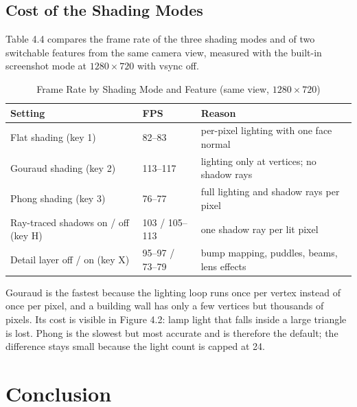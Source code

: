 \documentclass[12pt, a4paper]{report}
\begin{document}
\subsection*{Cost of the Shading Modes}

\begin{justify}
  {\fontsize{12}{13.8}\selectfont
    Table 4.4 compares the frame rate of the three shading modes and of two switchable features from the same camera view, measured with the built-in screenshot mode at $1280\times720$ with vsync off.
  }
\end{justify}

\begin{table}[!htbp]
  \caption{Frame Rate by Shading Mode and Feature (same view, $1280\times720$)}
  \label{tab:4.4}
  \centering
  {\fontsize{10}{12.5}\selectfont
    \begin{tabular}{|p{2.2in}|p{0.9in}|p{2.3in}|}
      \hline
      \textbf{Setting} & \textbf{FPS} & \textbf{Reason} \\
      \hline
      Flat shading (key 1) & 82--83 & per-pixel lighting with one face normal \\
      \hline
      Gouraud shading (key 2) & 113--117 & lighting only at vertices; no shadow rays \\
      \hline
      Phong shading (key 3) & 76--77 & full lighting and shadow rays per pixel \\
      \hline
      Ray-traced shadows on / off (key H) & 103 / 105--113 & one shadow ray per lit pixel \\
      \hline
      Detail layer off / on (key X) & 95--97 / 73--79 & bump mapping, puddles, beams, lens effects \\
      \hline
    \end{tabular}
  }
\end{table}

\begin{justify}
  {\fontsize{12}{13.8}\selectfont
    Gouraud is the fastest because the lighting loop runs once per vertex instead of once per pixel, and a building wall has only a few vertices but thousands of pixels. Its cost is visible in Figure 4.2: lamp light that falls inside a large triangle is lost. Phong is the slowest but most accurate and is therefore the default; the difference stays small because the light count is capped at 24.
  }
\end{justify}

\section{Conclusion}
\end{document}
